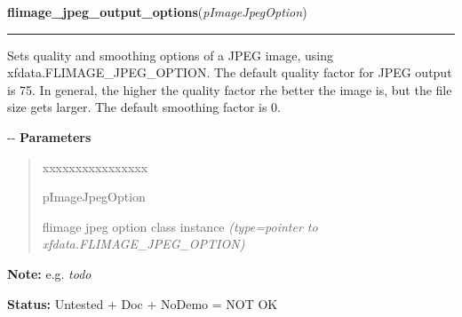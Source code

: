     \vspace{0.5ex}

\hspace{.8\funcindent}\begin{boxedminipage}{\funcwidth}

    \raggedright \textbf{flimage\_jpeg\_output\_options}(\textit{pImageJpegOption})

    \vspace{-1.5ex}

    \rule{\textwidth}{0.5\fboxrule}
\setlength{\parskip}{2ex}

Sets quality and smoothing options of a JPEG image, using
xfdata.FLIMAGE\_JPEG\_OPTION. The default quality factor for JPEG output
is 75. In general, the higher the quality factor rhe better the image
is, but the file size gets larger. The default smoothing factor is 0.

-{}-
\setlength{\parskip}{1ex}
      \textbf{Parameters}
      \vspace{-1ex}

      \begin{quote}
        \begin{Ventry}{xxxxxxxxxxxxxxxx}

          \item[pImageJpegOption]


flimage jpeg option class instance
            {\it (type=pointer to xfdata.FLIMAGE\_JPEG\_OPTION)}

        \end{Ventry}

      \end{quote}

\textbf{Note:} 
e.g. \emph{todo}


\textbf{Status:} 
Untested + Doc + NoDemo = NOT OK


    \end{boxedminipage}

    \label{xformslib:flflimage:flimage_pnm_output_options}

    \vspace{0.5ex}

